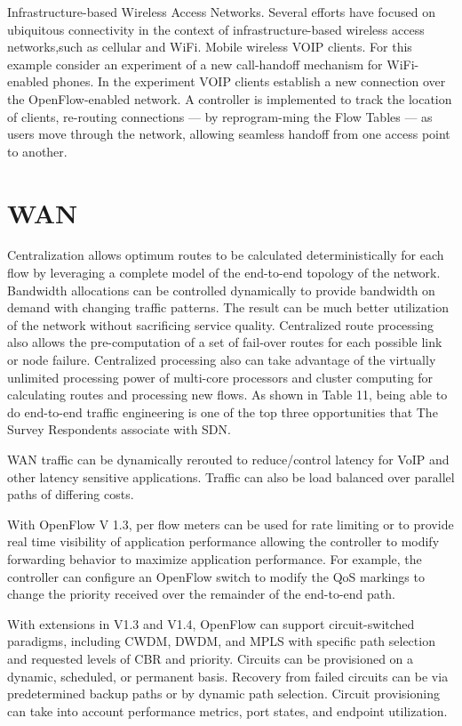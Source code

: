 Infrastructure-based Wireless Access Networks. Several efforts have focused on ubiquitous connectivity in the context of infrastructure-based wireless access networks,such as cellular and WiFi.
Mobile wireless VOIP clients. For this example consider an experiment of a new call-handoff mechanism for WiFi-enabled phones. In the experiment VOIP clients establish a new connection over the OpenFlow-enabled network. A controller is implemented to track the
location of clients, re-routing connections — by reprogram-ming the Flow Tables — as users move through the network, allowing seamless handoff from one access point to another. \cite{OpenFlowStanfordUsing}


\section{WAN}
Centralization allows optimum routes to be calculated deterministically for each flow by leveraging a complete model of the end-to-end topology of the network. Bandwidth allocations can be controlled dynamically to provide bandwidth on demand with changing traffic patterns. The result can be much better utilization of the network without sacrificing service quality. Centralized route processing also allows the pre-computation of a set of fail-over routes for each possible link or node failure. Centralized processing also can take advantage of the virtually unlimited processing power of multi-core processors and cluster computing for calculating routes and processing new flows. As shown in Table 11, being able to do end-to-end traffic engineering is one of the top three opportunities that The Survey Respondents associate with SDN.


WAN traffic can be dynamically rerouted to reduce/control latency for VoIP and other latency sensitive applications. Traffic can also be load balanced over parallel paths of differing costs.

With OpenFlow V 1.3, per flow meters can be used for rate limiting or to provide real time visibility of application performance allowing the controller to modify forwarding behavior to maximize application performance. For example, the controller can configure an OpenFlow switch to modify the QoS markings to change the priority received over the remainder of the end-to-end path.

With extensions in V1.3 and V1.4, OpenFlow can support circuit-switched paradigms, including CWDM, DWDM, and MPLS with specific path selection and requested levels of CBR and priority. Circuits can be provisioned on a dynamic, scheduled, or permanent basis. Recovery from failed circuits can be via predetermined backup paths or by dynamic path selection. Circuit provisioning can take into account performance metrics, port states, and endpoint utilization.

